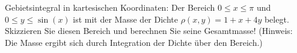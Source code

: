 \item Gebietsintegral in kartesischen Koordinaten: Der Bereich $0 \le x \le \pi$ und $0 \le y \le \sin(x)$ ist mit der Masse der Dichte $\rho(x,y)=1+x+4y$ belegt. Skizzieren Sie diesen Bereich und berechnen Sie seine Gesamtmasse! (Hinweis: Die Masse ergibt sich durch Integration der Dichte über den Bereich.)